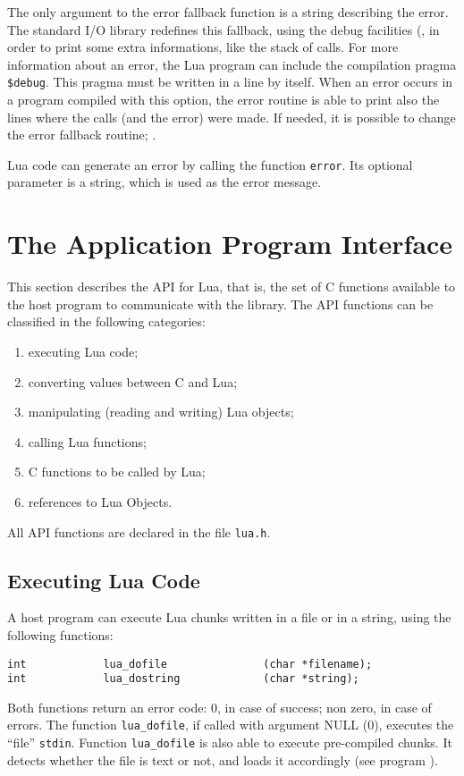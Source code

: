 The only argument to the error fallback function is a string describing
the error.
The standard I/O library redefines this fallback,
using the debug facilities (,
in order to print some extra informations,
like the stack of calls.
For more information about an error,
the Lua program can include the compilation pragma \verb'$debug'.
\label{pragma}
This pragma must be written in a line by itself.
When an error occurs in a program compiled with this option,
the error routine is able to print also the lines where the calls
(and the error) were made.
If needed, it is possible to change the error fallback routine;
.

Lua code can generate an error by calling the function \verb'error'.
Its optional parameter is a string,
which is used as the error message.


\section{The Application Program Interface}

This section describes the API for Lua, that is,
the set of C functions available to the host program to communicate
with the library.
The API functions can be classified in the following categories:
\begin{enumerate}
\item executing Lua code;
\item converting values between C and Lua;
\item manipulating (reading and writing) Lua objects;
\item calling Lua functions;
\item C functions to be called by Lua;
\item references to Lua Objects.
\end{enumerate}
All API functions are declared in the file \verb'lua.h'.

\subsection{Executing Lua Code}
A host program can execute Lua chunks written in a file or in a string,
using the following functions:
\begin{verbatim}
int            lua_dofile               (char *filename);
int            lua_dostring             (char *string);
\end{verbatim}
Both functions return an error code:
0, in case of success; non zero, in case of errors.
The function \verb'lua_dofile', if called with argument NULL (0),
executes the ``file'' {\tt stdin}.
Function \verb'lua_dofile' is also able to execute pre-compiled chunks.
It detects whether the file is text or not,
and loads it accordingly (see program ).

